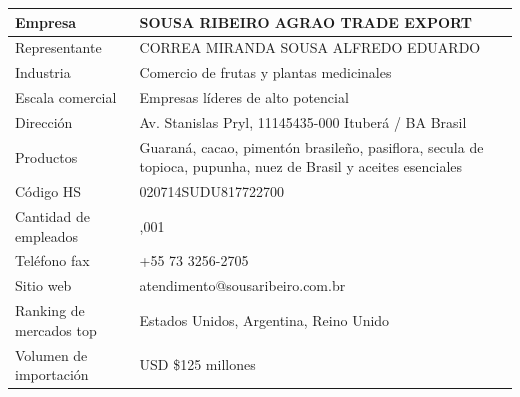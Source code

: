 \documentclass[
  stu,
  floatsintext,
  longtable,
  a4paper,
  nolmodern,
  notxfonts,
  notimes,
  12pt,
  colorlinks=true,linkcolor=blue,citecolor=blue,urlcolor=blue]{apa7}
\newcounter{none} %
\begin{document}
\begin{table}

{\caption{{Perfil Importador 1}{\label{tbl-importador1}}}}

{\def\LTcaptype{none} %
\begin{longtable}[]{@{}
  >{\raggedright\arraybackslash}p{}
  >{\raggedright\arraybackslash}p{}@{}}
\toprule\noalign{}
\begin{minipage}[b]{\linewidth}\raggedright
Empresa
\end{minipage} & \begin{minipage}[b]{\linewidth}\raggedright
SOUSA RIBEIRO AGRAO TRADE EXPORT
\end{minipage} \\
\midrule\noalign{}
\endhead
\bottomrule\noalign{}
\endlastfoot
Representante & CORREA MIRANDA SOUSA ALFREDO EDUARDO \\
Industria & Comercio de frutas y plantas medicinales \\
Escala comercial & Empresas líderes de alto potencial \\
Dirección & Av. Stanislas Pryl, 11145435-000 Ituberá / BA Brasil \\
Productos & Guaraná, cacao, pimentón brasileño, pasiflora, secula de
topioca, pupunha, nuez de Brasil y aceites esenciales \\
Código HS & 020714SUDU817722700 \\
Cantidad de empleados & 1,001 \\
Teléfono fax & +55 73 3256-2705 \\
Sitio web & atendimento@sousaribeiro.com.br \\
Ranking de mercados top & Estados Unidos, Argentina, Reino Unido \\
Volumen de importación & USD \$125 millones \\
\end{longtable}
}

\end{table}
\end{document}
